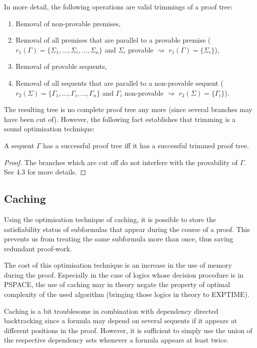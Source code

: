 \documentclass{llncs}
\begin{document}
In more detail, the following operations are valid trimmings of a proof tree:
\begin{enumerate}
\item Removal of non-provable premises,
\item Removal of all premises that are parallel to a provable premise ($r_1(\Gamma)=
      \{\Sigma_1,\ldots,\Sigma_i,\ldots,\Sigma_n\}$ and $\Sigma_i$ provable $\rightsquigarrow$
      $r_1(\Gamma)=\{\Sigma_i\}$),
\item Removal of provable sequents,
\item Removal of all sequents that are parallel to a non-provable sequent ($r_2(\Sigma)=
      \{\Gamma_1,\ldots,\Gamma_i,\ldots,\Gamma_n\}$ and $\Gamma_i$ non-provable $\rightsquigarrow$
      $r_2(\Sigma)=\{\Gamma_i\}$).
\end{enumerate}
The resulting tree is no complete proof tree any more (since several branches may have been
cut of). However, the following fact establishes that trimming is a sound optimisation
technique:

\begin{lemma} A sequent $\Gamma$ has a successful proof tree iff it has a successful
trimmed proof tree.
\begin{proof}
The branches which are cut off do not interfere with the provability of $\Gamma$. See 4.3
for more details.
\end{proof}
\end{lemma}

\subsection{Caching}

Using the optimisation technique of caching, it is possible to store the satisfiability
status of subformulas that appear during the course of a proof. This prevents us from
treating the same subformula more than once, thus saving redundant proof-work.

The cost of this optimisation technique is an increase in the use of memory during
the proof. Especially in the case of logics whose decision procedure is in PSPACE,
the use of caching may in theory negate the property of optimal complexity of the used
algorithm (bringing those logics in theory to EXPTIME).

Caching is a bit troublesome in combination with dependency directed
backtracking since a formula may depend on several sequents if
it appears at different positions in the proof. However, it is sufficient
to simply use the union of the respective dependency sets whenever a formula
appears at least twice.
\end{document}
